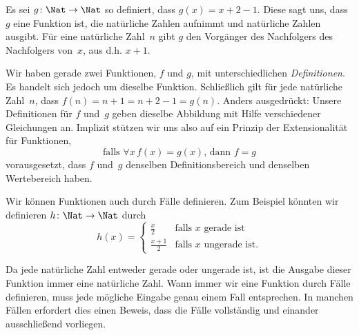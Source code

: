 \documentclass[../../../include/open-logic-section]{subfiles}
\begin{document}
  \begin{ex}
  Es sei $g \colon \Nat \to \Nat$ so definiert, dass $g(x) = x+2-1$. Diese
  sagt uns, dass $g$ eine Funktion ist, die natürliche Zahlen aufnimmt und
  natürliche Zahlen ausgibt. Für eine natürliche Zahl~$n$ gibt $g$
  den Vorgänger des Nachfolgers des Nachfolgers von~$x$, aus d.h.
  $x+1$.
  \end{ex}
  
  \begin{explain}
  Wir haben gerade zwei Funktionen, $f$ und $g$, mit unterschiedlichen
  \emph{Definitionen}. Es handelt sich jedoch um dieselbe Funktion.
  Schließlich gilt für jede natürliche Zahl~$n$, dass $f(n) = n+1 = n+2-1 =
  g(n)$. Anders ausgedrückt: Unsere Definitionen für $f$ und~$g$ geben
  dieselbe Abbildung mit Hilfe verschiedener Gleichungen an. Implizit stützen wir uns also
  auf ein Prinzip der Extensionalität für Funktionen, 
  \[
    \text{falls }\forall x\, f(x) = g(x)\text{, dann }f = g
  \]
  vorausgesetzt, dass $f$ und~$g$ denselben Definitionsbereich und denselben Wertebereich haben.
  \end{explain}
  
  \begin{ex}
  Wir können Funktionen auch durch Fälle definieren. Zum Beispiel könnten wir definieren
  $h \colon \Nat \to \Nat$ durch
  \[
  h(x) =
  \begin{cases}
    \frac{x}{2} & \text{falls $x$ gerade ist} \\
    \frac{x+1}{2} & \text{falls $x$ ungerade ist.}
  \end{cases}
  \]

  Da jede natürliche Zahl entweder gerade oder ungerade ist, ist die Ausgabe dieser
  Funktion immer eine natürliche Zahl. Wann immer wir
  eine Funktion durch Fälle definieren, muss jede mögliche Eingabe
  genau einem Fall entsprechen.  In manchen Fällen erfordert dies einen Beweis, dass die
  Fälle vollständig und einander ausschließend vorliegen.
  \end{ex}
  
  
\end{document}

